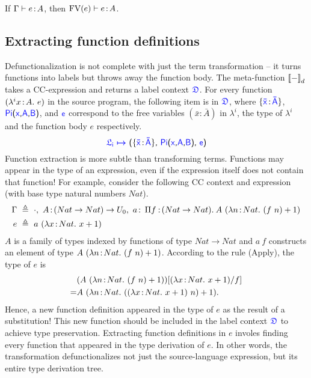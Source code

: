\begin{lemma}If $\Gamma \vdash e \hspace{0.5mm}{:}\hspace{0.5mm} A$, then $\text{FV}(e) \vdash e \hspace{0.5mm}{:}\hspace{0.5mm} A$.
\label{lem:fv}
\end{lemma}

\subsection{Extracting function definitions}

Defunctionalization is not complete with just the term transformation -- it turns functions into labels but throws away the function body. The meta-function ${[\![ - ]\!]}_d$ takes a CC-expression and returns a label context $\target{\fdef}$.
For every function $(\lambda^{i}x\hspace{0.5mm}{:}\hspace{0.5mm} A.\ e)$ in the source program, the following item is in $\target{\fdef}$, where $\{\itemtype{\bar{x}}{\bar{A}}\}$, $\targetpi{x}{A}{B}$, and $\target{e}$ correspond to the free variables $(\bar{x} \mathrel{:} \bar{A})$ in $\lambda^i$, the type of $\lambda^i$ and the function body $e$ respectively.
\begin{equation*}
	\itemdef{\target{\flabel_i}}{\itemtype{\bar{x}}{\bar{A}}}{\targetpi{x}{A}{B}}{\target{e}}
\end{equation*}
Function extraction is more subtle than transforming terms. Functions may appear in the type of an expression, even if the expression itself does not contain that function! For example, consider the following CC context and expression (with base type natural numbers $Nat$).
\begin{align*}
	\Gamma\ & \triangleq\ \cdot,\ A \goodcolon (Nat \rightarrow Nat) \rightarrow U_0,\ 
	a \goodcolon\ \pitype{f}{(Nat \rightarrow Nat)}{A\ (\lam{n}{Nat}{(f\ n) + 1})} \\
	e\ & \triangleq\ a\ (\lam{x}{Nat}{x+1})
\end{align*}
$A$ is a family of types indexed by functions of type $Nat \rightarrow Nat$ and $a\ f$ constructs an element of type $A\ (\lam{n}{Nat}{(f\ n) + 1})$. According to the rule (Apply), the type of $e$ is 
\begin{align*}
	& (A\ (\lambda n\hspace{0.5mm}{:}\hspace{0.5mm} Nat.\ (f\ n) + 1))[(\lambda x\hspace{0.5mm}{:}\hspace{0.5mm} Nat.\ x+1)\slash f]\\
	=& A\ (\lambda n\hspace{0.5mm}{:}\hspace{0.5mm} Nat.\ ((\lambda x\hspace{0.5mm}{:}\hspace{0.5mm} Nat.\ x+1)\ n) + 1).
\end{align*}
Hence, a new function definition appeared in the type of $e$ as the result of a substitution! This new function should be included in the label context $\target{\fdef}$ to achieve type preservation. Extracting function definitions in $e$ involes finding every function that appeared in the type derivation of $e$. In other words, the transformation defunctionalizes not just the source-language expression, but its entire type derivation tree.

